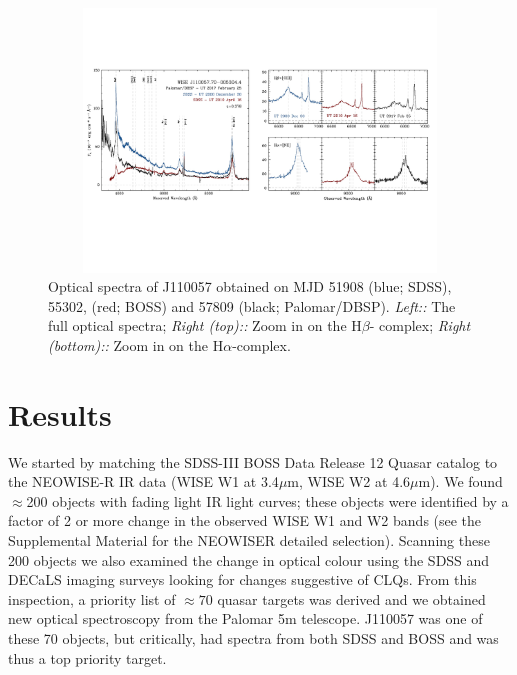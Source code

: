 \documentclass{nature}
\begin{document}
\begin{figure}
  \includegraphics[width=16.00cm, height=7.00cm, trim=0.0cm 0.0cm 0.0cm 0.0cm, clip]
  {../plots/spectra/J110057_spectra_wBalmers.pdf}
  \centering
  \caption[]{
Optical spectra of J110057 obtained on MJD 51908 (blue; SDSS), 55302,
(red; BOSS) and 57809 (black; Palomar/DBSP).  {\it Left::} The full
optical spectra; {\it Right (top)::} Zoom in on the H$\beta$-\oiii
complex; {\it Right (bottom)::} Zoom in on the H$\alpha$-\nii complex.
}
  \label{fig:J110057_spectra}
\end{figure}
\section{Results}  
We started by matching the SDSS-III BOSS Data Release 12 Quasar
catalog \cite[DR12Q; ][]{Paris2017} to the NEOWISE-R IR data (WISE W1
at 3.4$\mu$m, WISE W2 at 4.6$\mu$m). We found $\approx$200 objects
with fading light IR light curves; these objects were identified by a
factor of 2 or more change in the observed WISE W1 and W2 bands (see
the Supplemental Material for the NEOWISER detailed selection).
Scanning these 200 objects we also examined the change in optical
colour using the SDSS and DECaLS imaging surveys looking for changes
suggestive of CLQs. From this inspection, a priority list of
$\approx70$ quasar targets was derived and we obtained new optical
spectroscopy from the Palomar 5m telescope.  J110057 was one of these
70 objects, but critically, had spectra from both SDSS and BOSS and
was thus a top priority target.
\end{document}
